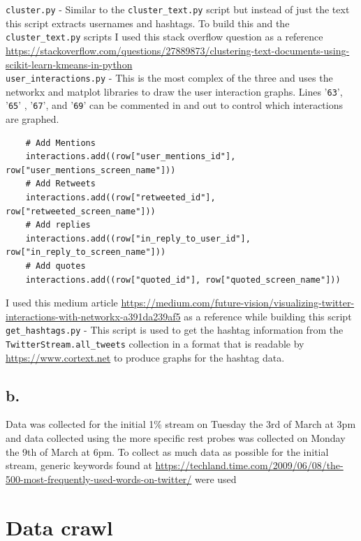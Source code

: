 \documentclass[10pt,a4paper]{article}
\begin{document}
	\verb|cluster.py| - Similar to the \verb|cluster_text.py| script but instead of just the text this script extracts usernames and hashtags. To build this and the \verb|cluster_text.py| scripts I used this stack overflow question as a reference \url{https://stackoverflow.com/questions/27889873/clustering-text-documents-using-scikit-learn-kmeans-in-python} \\
	
	\verb|user_interactions.py| - This is the most complex of the three and uses the networkx and matplot libraries to draw the user interaction graphs. Lines '\verb|63|', '\verb|65|' , '\verb|67|', and '\verb|69|' can be commented in and out to control which interactions are graphed.
	\begin{verbatim}
    # Add Mentions
    interactions.add((row["user_mentions_id"], row["user_mentions_screen_name"]))
    # Add Retweets
    interactions.add((row["retweeted_id"], row["retweeted_screen_name"]))
    # Add replies
    interactions.add((row["in_reply_to_user_id"], row["in_reply_to_screen_name"]))
    # Add quotes
    interactions.add((row["quoted_id"], row["quoted_screen_name"]))
	\end{verbatim}
	I used this medium article \url{https://medium.com/future-vision/visualizing-twitter-interactions-with-networkx-a391da239af5} as a reference while building this script \\
	
	\verb|get_hashtags.py| - This script is used to get the hashtag information from the \verb|TwitterStream.all_tweets| collection in a format that is readable by \url{https://www.cortext.net} to produce graphs for the hashtag data.
	
	
\subsection*{b. } 
Data was collected for the initial 1\% stream on Tuesday the 3rd of March at 3pm and data collected using the more specific rest probes was collected on Monday the 9th of March at 6pm. To collect as much data as possible for the initial stream, generic keywords found at \url{https://techland.time.com/2009/06/08/the-500-most-frequently-used-words-on-twitter/} were used 

\section{Data crawl}
\end{document}
